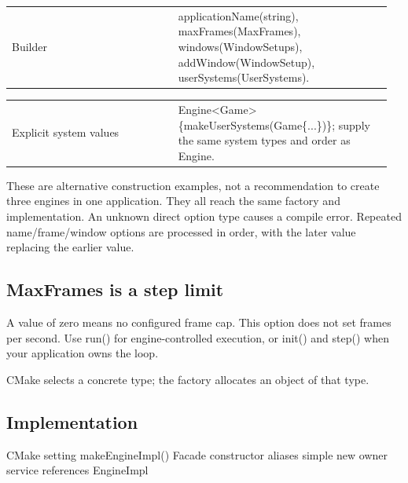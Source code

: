 \documentclass[11pt,a4paper]{article}
\begin{document}
{\small
\begin{longtable}{@{}p{0.42\linewidth}p{0.54\linewidth}@{}}
Builder & applicationName(string), maxFrames(MaxFrames), windows(WindowSetups), addWindow(WindowSetup), userSystems(UserSystems). \\
\end{longtable}
}

{\small
\begin{longtable}{@{}p{0.42\linewidth}p{0.54\linewidth}@{}}
Explicit system values & Engine<Game>\{makeUserSystems(Game\{...\})\}; supply the same system types and order as Engine. \\
\end{longtable}
}

These are alternative construction examples, not a recommendation to create three engines in one application. They all reach the same factory and implementation. An unknown direct option type causes a compile error. Repeated name/frame/window options are processed in order, with the later value replacing the earlier value.

\subsection*{MaxFrames is a step limit}
A value of zero means no configured frame cap. This option does not set frames per second. Use run() for engine-controlled execution, or init() and step() when your application owns the loop.

\label{core-8}
CMake selects a concrete type; the factory allocates an object of that type.

\subsection*{Implementation}
CMake setting                                          makeEngineImpl()            Facade constructor aliases simple                                                 new owner                  service references EngineImpl
\end{document}
